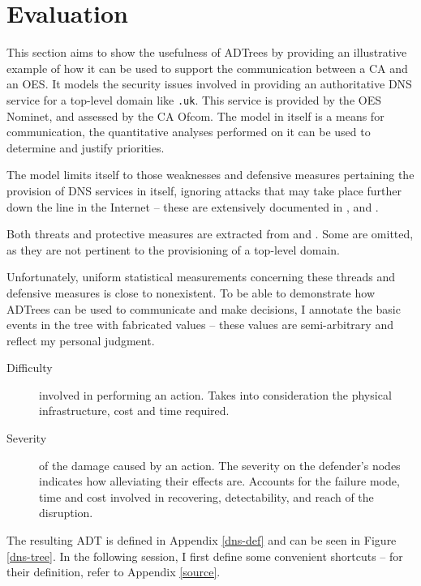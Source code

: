 \documentclass{scrreprt}
\begin{document}
\chapter{Evaluation}
\label{evaluation}

This section aims to show the usefulness of ADTrees by providing an illustrative
example of how it can be used to support the communication between a CA and an
OES. It models the security issues involved in providing an authoritative DNS
service for a top-level domain like \texttt{.uk}. This service is provided by
the OES Nominet, and assessed by the CA Ofcom. The model in itself is a means
for communication, the quantitative analyses performed on it can be used to
determine and justify priorities.

The model limits itself to those weaknesses and defensive measures pertaining
the provision of DNS services in itself, ignoring attacks that may take place
further down the line in the Internet -- these are extensively documented in
\cite{weaknesses-dns}, \cite{rfc3833} and \cite{dns-bind-sec}.

Both threats and protective measures are extracted from \cite[sections 3, 5, 7,
and 10]{secdns} and \cite{dns-threat-analysis}. Some are omitted, as they are
not pertinent to the provisioning of a top-level domain. 

Unfortunately, uniform statistical measurements concerning these threads and
defensive measures is close to nonexistent. To be able to demonstrate how
ADTrees can be used to communicate and make decisions, I annotate the basic
events in the tree with fabricated values -- these values are semi-arbitrary and
reflect my personal judgment.

\begin{description}
    \item [Difficulty] involved in performing an action. Takes into
        consideration the physical infrastructure, cost and time required.
    \item [Severity] of the damage caused by an action. The severity on the
        defender's nodes indicates how alleviating their effects are. Accounts
        for the failure mode, time and cost involved in recovering,
        detectability, and reach of the disruption.
\end{description}

The resulting ADT is defined in Appendix \ref{dns-def} and can be seen in Figure
\ref{dns-tree}. In the following session, I first define some convenient
shortcuts -- for their definition, refer to Appendix \ref{source}.
\end{document}
